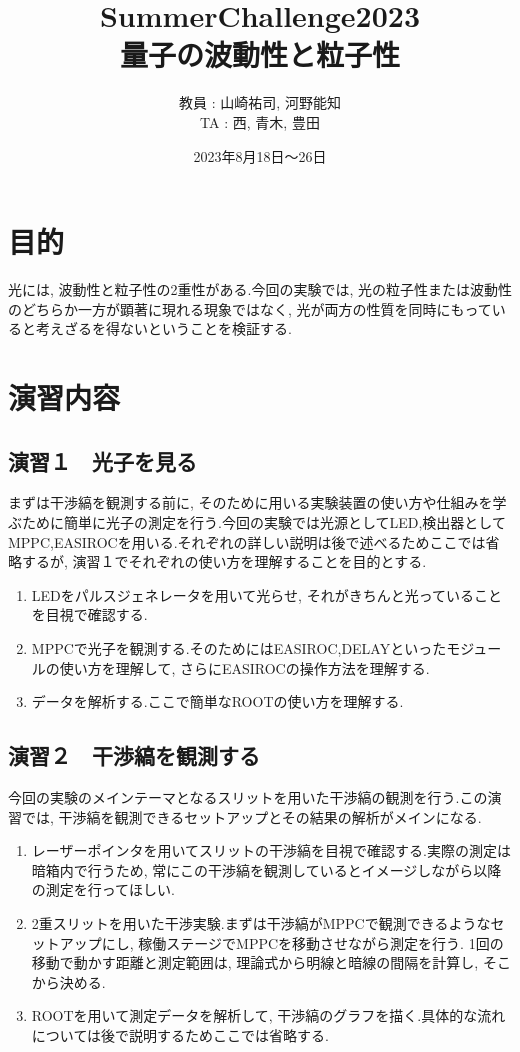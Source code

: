 \documentclass[uplatex,10pt,a4j]{jsarticle}
\begin{document}
\begin{titlepage}
  \title{SummerChallenge2023 \\ \Huge 量子の波動性と粒子性}
  \author{教員 : 山崎祐司, 河野能知 \\TA : 西, 青木, 豊田}
  \date{2023年8月18日〜26日}
  \maketitle
\end{titlepage}

\tableofcontents
\clearpage

\section{目的}
光には, 波動性と粒子性の2重性がある.今回の実験では, 光の粒子性または波動性のどちらか一方が顕著に現れる現象ではなく, 光が両方の性質を同時にもっていると考えざるを得ないということを検証する.

\section{演習内容}

\subsection{演習１　光子を見る}
まずは干渉縞を観測する前に, そのために用いる実験装置の使い方や仕組みを学ぶために簡単に光子の測定を行う.今回の実験では光源としてLED,検出器としてMPPC,EASIROCを用いる.それぞれの詳しい説明は後で述べるためここでは省略するが, 演習１でそれぞれの使い方を理解することを目的とする.
\begin{enumerate}
  \item LEDをパルスジェネレータを用いて光らせ, それがきちんと光っていることを目視で確認する.
  \item MPPCで光子を観測する.そのためにはEASIROC,DELAYといったモジュールの使い方を理解して, さらにEASIROCの操作方法を理解する.
  \item データを解析する.ここで簡単なROOTの使い方を理解する.
\end{enumerate}

\subsection{演習２　干渉縞を観測する}
今回の実験のメインテーマとなるスリットを用いた干渉縞の観測を行う.この演習では, 干渉縞を観測できるセットアップとその結果の解析がメインになる.
\begin{enumerate}
  \item レーザーポインタを用いてスリットの干渉縞を目視で確認する.実際の測定は暗箱内で行うため, 常にこの干渉縞を観測しているとイメージしながら以降の測定を行ってほしい.
  \item 2重スリットを用いた干渉実験.まずは干渉縞がMPPCで観測できるようなセットアップにし, 稼働ステージでMPPCを移動させながら測定を行う.
  1回の移動で動かす距離と測定範囲は, 理論式から明線と暗線の間隔を計算し, そこから決める.
  \item ROOTを用いて測定データを解析して, 干渉縞のグラフを描く.具体的な流れについては後で説明するためここでは省略する.
\end{enumerate}
\end{document}

